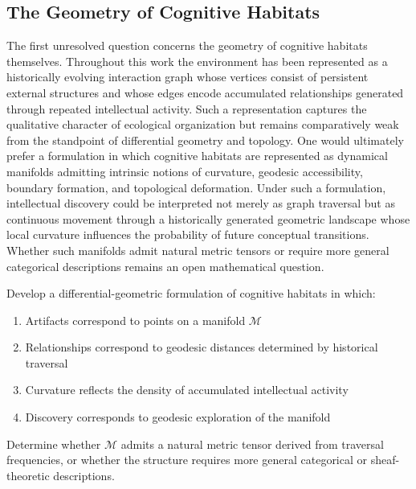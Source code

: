 \documentclass[12pt,oneside]{article}
\theoremstyle{remark}
\begin{document}
\subsection{The Geometry of Cognitive Habitats}

The first unresolved question concerns the geometry of cognitive habitats themselves. Throughout this work the environment has been represented as a historically evolving interaction graph whose vertices consist of persistent external structures and whose edges encode accumulated relationships generated through repeated intellectual activity. Such a representation captures the qualitative character of ecological organization but remains comparatively weak from the standpoint of differential geometry and topology. One would ultimately prefer a formulation in which cognitive habitats are represented as dynamical manifolds admitting intrinsic notions of curvature, geodesic accessibility, boundary formation, and topological deformation. Under such a formulation, intellectual discovery could be interpreted not merely as graph traversal but as continuous movement through a historically generated geometric landscape whose local curvature influences the probability of future conceptual transitions. Whether such manifolds admit natural metric tensors or require more general categorical descriptions remains an open mathematical question.

\begin{problem}
Develop a differential-geometric formulation of cognitive habitats in which:
\begin{enumerate}
\item Artifacts correspond to points on a manifold \(\mathcal{M}\)
\item Relationships correspond to geodesic distances determined by historical traversal
\item Curvature reflects the density of accumulated intellectual activity
\item Discovery corresponds to geodesic exploration of the manifold
\end{enumerate}
Determine whether \(\mathcal{M}\) admits a natural metric tensor derived from traversal frequencies, or whether the structure requires more general categorical or sheaf-theoretic descriptions.
\end{problem}
\end{document}
